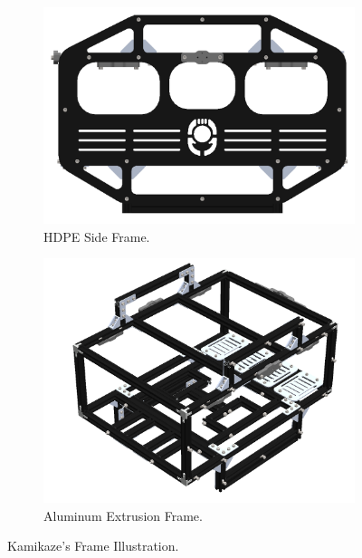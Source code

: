 \begin{figure}[b]
    \centering
    \begin{subfigure}[b]{0.45\columnwidth}
        \includegraphics[width=\textwidth]{Sections/2Design Rationale/images/side frame.png}
        \caption{HDPE Side Frame.}
        \label{fig:side_frame}
    \end{subfigure}
    \hfill
    \begin{subfigure}[b]{0.5\columnwidth}
        \includegraphics[width=\textwidth]{Sections/2Design Rationale/images/frame.png}
        \caption{Aluminum Extrusion Frame.}
        \label{fig:frame}
    \end{subfigure}
    \caption{Kamikaze's Frame Illustration.}
    \label{fig:full_frame}
\end{figure}

